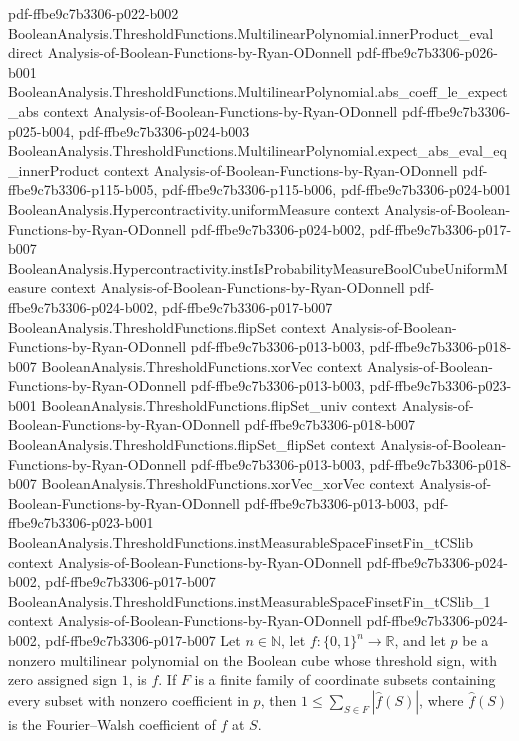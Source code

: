 \begin{theorem}
  {pdf-ffbe9c7b3306-p022-b002}
\proofstep
  {BooleanAnalysis.ThresholdFunctions.MultilinearPolynomial.innerProduct_eval}
  {direct}
  {Analysis-of-Boolean-Functions-by-Ryan-ODonnell}
  {pdf-ffbe9c7b3306-p026-b001}
\proofstep
  {BooleanAnalysis.ThresholdFunctions.MultilinearPolynomial.abs_coeff_le_expect_abs}
  {context}
  {Analysis-of-Boolean-Functions-by-Ryan-ODonnell}
  {pdf-ffbe9c7b3306-p025-b004,
    pdf-ffbe9c7b3306-p024-b003}
\proofstep
  {BooleanAnalysis.ThresholdFunctions.MultilinearPolynomial.expect_abs_eval_eq_innerProduct}
  {context}
  {Analysis-of-Boolean-Functions-by-Ryan-ODonnell}
  {pdf-ffbe9c7b3306-p115-b005,
    pdf-ffbe9c7b3306-p115-b006,
    pdf-ffbe9c7b3306-p024-b001}
\proofstep
  {BooleanAnalysis.Hypercontractivity.uniformMeasure}
  {context}
  {Analysis-of-Boolean-Functions-by-Ryan-ODonnell}
  {pdf-ffbe9c7b3306-p024-b002,
    pdf-ffbe9c7b3306-p017-b007}
\proofstep
  {BooleanAnalysis.Hypercontractivity.instIsProbabilityMeasureBoolCubeUniformMeasure}
  {context}
  {Analysis-of-Boolean-Functions-by-Ryan-ODonnell}
  {pdf-ffbe9c7b3306-p024-b002,
    pdf-ffbe9c7b3306-p017-b007}
\proofstep
  {BooleanAnalysis.ThresholdFunctions.flipSet}
  {context}
  {Analysis-of-Boolean-Functions-by-Ryan-ODonnell}
  {pdf-ffbe9c7b3306-p013-b003,
    pdf-ffbe9c7b3306-p018-b007}
\proofstep
  {BooleanAnalysis.ThresholdFunctions.xorVec}
  {context}
  {Analysis-of-Boolean-Functions-by-Ryan-ODonnell}
  {pdf-ffbe9c7b3306-p013-b003,
    pdf-ffbe9c7b3306-p023-b001}
\proofstep
  {BooleanAnalysis.ThresholdFunctions.flipSet_univ}
  {context}
  {Analysis-of-Boolean-Functions-by-Ryan-ODonnell}
  {pdf-ffbe9c7b3306-p018-b007}
\proofstep
  {BooleanAnalysis.ThresholdFunctions.flipSet_flipSet}
  {context}
  {Analysis-of-Boolean-Functions-by-Ryan-ODonnell}
  {pdf-ffbe9c7b3306-p013-b003,
    pdf-ffbe9c7b3306-p018-b007}
\proofstep
  {BooleanAnalysis.ThresholdFunctions.xorVec_xorVec}
  {context}
  {Analysis-of-Boolean-Functions-by-Ryan-ODonnell}
  {pdf-ffbe9c7b3306-p013-b003,
    pdf-ffbe9c7b3306-p023-b001}
\proofstep
  {BooleanAnalysis.ThresholdFunctions.instMeasurableSpaceFinsetFin_tCSlib}
  {context}
  {Analysis-of-Boolean-Functions-by-Ryan-ODonnell}
  {pdf-ffbe9c7b3306-p024-b002,
    pdf-ffbe9c7b3306-p017-b007}
\proofstep
  {BooleanAnalysis.ThresholdFunctions.instMeasurableSpaceFinsetFin_tCSlib_1}
  {context}
  {Analysis-of-Boolean-Functions-by-Ryan-ODonnell}
  {pdf-ffbe9c7b3306-p024-b002,
    pdf-ffbe9c7b3306-p017-b007}
Let $n\in\mathbb N$, let $f:\{0,1\}^n\to\mathbb R$, and let $p$ be a nonzero multilinear
polynomial on the Boolean cube whose threshold sign, with zero assigned sign $1$, is
$f$. If $F$ is a finite family of coordinate subsets containing every subset with
nonzero coefficient in $p$, then $1\leq\sum_{S\in F}|\widehat f(S)|$, where $\widehat
f(S)$ is the Fourier–Walsh coefficient of $f$ at $S$.
\end{theorem}

